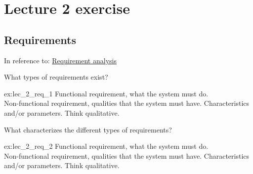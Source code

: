 \section{Lecture 2 exercise}
\subsection{Requirements}
In reference to: \href{chp:requirement_analysis}{Requirement analysis}
\begin{exercise}{\parbox{\linewidth*3/4}{What types of requirements exist?}}{ex:lec_2_req_1}
    Functional requirement, what the system must do.\\
    Non-functional requirement, qualities that the system must have. Characteristics and/or parameters. Think qualitative.
\end{exercise}

\begin{exercise}{\parbox{\linewidth*3/4}{What characterizes the different types of requirements?}}{ex:lec_2_req_2}
    Functional requirement, what the system must do.\\
    Non-functional requirement, qualities that the system must have. Characteristics and/or parameters. Think qualitative.
\end{exercise}

